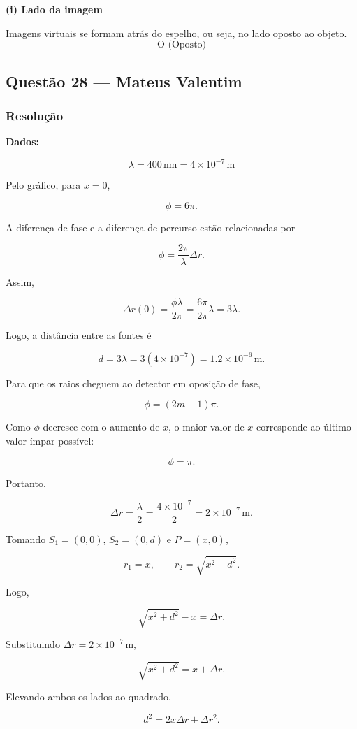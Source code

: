 \documentclass[12pt,a4paper]{article}
\begin{document}
\textbf{(i) Lado da imagem}

Imagens virtuais se formam atrás do espelho, ou seja, no lado oposto ao objeto.
\[
\boxed{\text{O (Oposto)}}
\]

\subsection{Questão 28 — Mateus Valentim}
\subsubsection{Resolução}
\textbf{Dados:}

\[
\lambda = 400\,\text{nm} = 4\times10^{-7}\,\text{m}
\]

Pelo gráfico, para \(x=0\),

\[
\phi = 6\pi.
\]

A diferença de fase e a diferença de percurso estão relacionadas por

\[
\phi=\frac{2\pi}{\lambda}\Delta r.
\]

Assim,

\[
\Delta r(0)=\frac{\phi\lambda}{2\pi}
=\frac{6\pi}{2\pi}\lambda
=3\lambda.
\]

Logo, a distância entre as fontes é

\[
d=3\lambda
=3(4\times10^{-7})
=1.2\times10^{-6}\,\text{m}.
\]

Para que os raios cheguem ao detector em oposição de fase,

\[
\phi=(2m+1)\pi.
\]

Como \(\phi\) decresce com o aumento de \(x\), o maior valor de \(x\)
corresponde ao último valor ímpar possível:

\[
\phi=\pi.
\]

Portanto,

\[
\Delta r=\frac{\lambda}{2}
=\frac{4\times10^{-7}}{2}
=2\times10^{-7}\,\text{m}.
\]

Tomando \(S_1=(0,0)\), \(S_2=(0,d)\) e \(P=(x,0)\),

\[
r_1=x,
\qquad
r_2=\sqrt{x^2+d^2}.
\]

Logo,

\[
\sqrt{x^2+d^2}-x=\Delta r.
\]

Substituindo \(\Delta r=2\times10^{-7}\,\text{m}\),

\[
\sqrt{x^2+d^2}=x+\Delta r.
\]

Elevando ambos os lados ao quadrado,

\[
d^2=2x\Delta r+\Delta r^2.
\]
\end{document}
